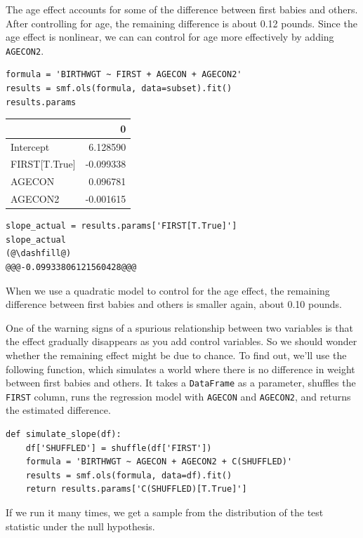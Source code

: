 The age effect accounts for some of the difference between first babies
and others. After controlling for age, the remaining difference is about
0.12 pounds. Since the age effect is nonlinear, we can can control for
age more effectively by adding \passthrough{\lstinline!AGECON2!}.

\begin{lstlisting}[]
formula = 'BIRTHWGT ~ FIRST + AGECON + AGECON2'
results = smf.ols(formula, data=subset).fit()
results.params
\end{lstlisting}

\begin{tabular}{lr}
\midrule
{} &         0 \\
\midrule
Intercept     &  6.128590 \\
FIRST[T.True] & -0.099338 \\
AGECON        &  0.096781 \\
AGECON2       & -0.001615 \\
\midrule
\end{tabular}

\begin{lstlisting}[]
slope_actual = results.params['FIRST[T.True]']
slope_actual
(@\dashfill@)
@@@-0.09933806121560428@@@
\end{lstlisting}

When we use a quadratic model to control for the age effect, the
remaining difference between first babies and others is smaller again,
about 0.10 pounds.

One of the warning signs of a spurious relationship between two
variables is that the effect gradually disappears as you add control
variables. So we should wonder whether the remaining effect might be due
to chance. To find out, we'll use the following function, which
simulates a world where there is no difference in weight between first
babies and others. It takes a \passthrough{\lstinline!DataFrame!} as a
parameter, shuffles the \passthrough{\lstinline!FIRST!} column, runs the
regression model with \passthrough{\lstinline!AGECON!} and
\passthrough{\lstinline!AGECON2!}, and returns the estimated difference.

\begin{lstlisting}[]
def simulate_slope(df):
    df['SHUFFLED'] = shuffle(df['FIRST'])
    formula = 'BIRTHWGT ~ AGECON + AGECON2 + C(SHUFFLED)'
    results = smf.ols(formula, data=df).fit()
    return results.params['C(SHUFFLED)[T.True]']
\end{lstlisting}

If we run it many times, we get a sample from the distribution of the
test statistic under the null hypothesis.

